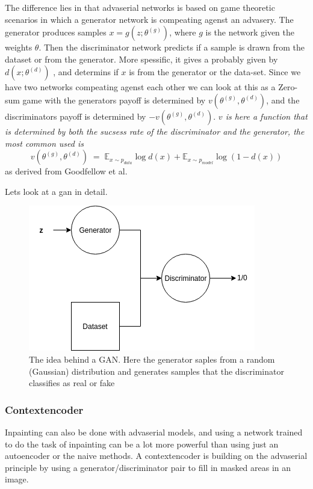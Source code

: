 	  The difference lies in that advaserial networks is based on game theoretic scenarios in which a generator network is compeating agenst an advasery. 
	  The generator produces samples $x=g(z;\theta^{(g)})$, where $g$ is the network given the weights $\theta$. Then the discriminator network predicts if a sample is drawn from the dataset or from the generator.
	  More spessific, it gives a probably given by $d(x;\theta^{(d)})$ , and determins if $x$ is from the generator or the data-set. 
	  Since we have two networks compeating agenst each other we can look at this as a Zero-sum game with the generators payoff is determined by $v(\theta^{(g)},\theta^{(d)})$, and the discriminators payoff is determined 
	  by $-v(\theta^{(g)},\theta^{(d)})$.
	  \textit{$v$ is here a function that is determined by both the sucsess rate of the discriminator and the generator, the most common used is}
	  \begin{equation}
	  v(\theta^{(g)},\theta^{(d)}) \; = \; \mathds{E}_{x\sim p_{data}}\log{d(x)} + \mathds{E}_{x\sim p_{model}}\log{(1 - d(x))} %
	  \end{equation}
	  as derived from Goodfellow et al. %
	  
	  Lets look at a gan in detail. \\
	  \begin{figure}[ht!]
	    \centering
	    \includegraphics[scale=0.5]{background/figures/simpleGAN.png}
	    \caption{The idea behind a GAN. Here the generator saples from a random (Gaussian) distribution and generates samples that the discriminator classifies as real or fake}
	\end{figure}
	
	
      \subsubsection{Contextencoder}
	Inpainting can also be done with advaserial models, and using a network trained to do the task of inpainting can be a lot more powerful than using just an autoencoder or the naive methods.
	A contextencoder is building on the advaserial principle by using a generator/discriminator pair to fill in masked areas in an image. 
	
